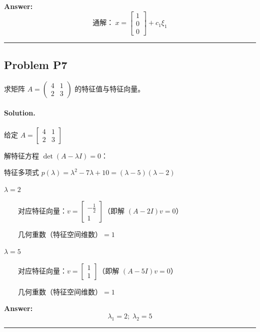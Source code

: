 \documentclass[12pt, a4paper]{article}
\newcommand{\problem}[1]{\subsection*{Problem #1}}
\newcommand{\solution}{\paragraph{Solution.}}
\begin{document}
\textbf{Answer:}
\[\text{通解：}\ x = \left[\begin{matrix}1\\0\\0\end{matrix}\right] + c_{1}\xi_{1}\]


\vspace{1em}
\hrule
\vspace{1em}

\problem{P7}

求矩阵 $A = \begin{pmatrix} 4 & 1 \\ 2 & 3 \end{pmatrix}$ 的特征值与特征向量。

\solution


给定 $A = \left[\begin{matrix}4 & 1\\2 & 3\end{matrix}\right]$

解特征方程 $\det(A - \lambda I) = 0$：

特征多项式 $p(\lambda) = \lambda^{2} - 7 \lambda + 10 = \left(\lambda - 5\right) \left(\lambda - 2\right)$

$\lambda = 2$

　　对应特征向量：$v = \left[\begin{matrix}- \frac{1}{2}\\1\end{matrix}\right]$（即解 $(A - 2I)v = 0$）

　　几何重数（特征空间维数）$= 1$

$\lambda = 5$

　　对应特征向量：$v = \left[\begin{matrix}1\\1\end{matrix}\right]$（即解 $(A - 5I)v = 0$）

　　几何重数（特征空间维数）$= 1$

\textbf{Answer:}
\[\lambda_{1} = 2;\; \lambda_{2} = 5\]


\vspace{1em}
\hrule
\vspace{1em}
\end{document}
